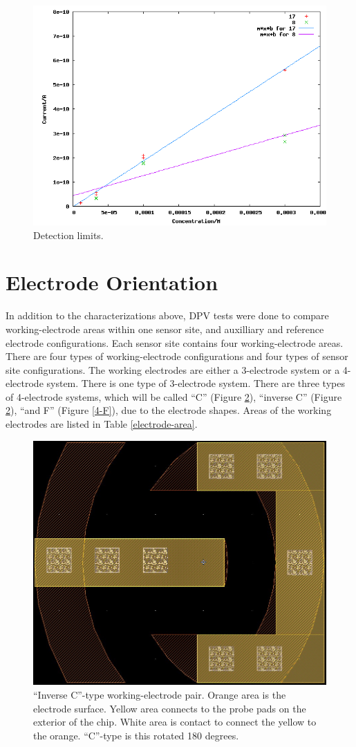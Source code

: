 \begin{figure}
	\centering
	\includegraphics[width=\linewidth]{figures/limit.png}
	\caption{Detection limits.}
	\label{limit figure}
\end{figure}

\section{Electrode Orientation}

In addition to the characterizations above, DPV tests were done to compare working-electrode areas within one sensor site, and auxilliary and reference electrode configurations. Each sensor site contains four working-electrode areas. There are four types of working-electrode configurations and four types of sensor site configurations. The working electrodes are either a 3-electrode system or a 4-electrode system. There is one type of 3-electrode system. There are three types of 4-electrode systems, which will be called ``C'' (Figure \ref{4-C}), ``inverse C'' (Figure \ref{4-C}), ``and F'' (Figure \ref{4-F}), due to the electrode shapes. Areas of the working electrodes are listed in Table \ref{electrode-area}.

\begin{figure}
	\centering
	\includegraphics[width=0.3\linewidth]{figures/4-C.png}
	\caption[``Inverse C''-type working-electrode pair.]{``Inverse C''-type working-electrode pair. Orange area is the electrode surface. Yellow area connects to the probe pads on the exterior of the chip. White area is contact to connect the yellow to the orange. ``C''-type is this rotated 180 degrees.}
	\label{4-C}
\end{figure}

